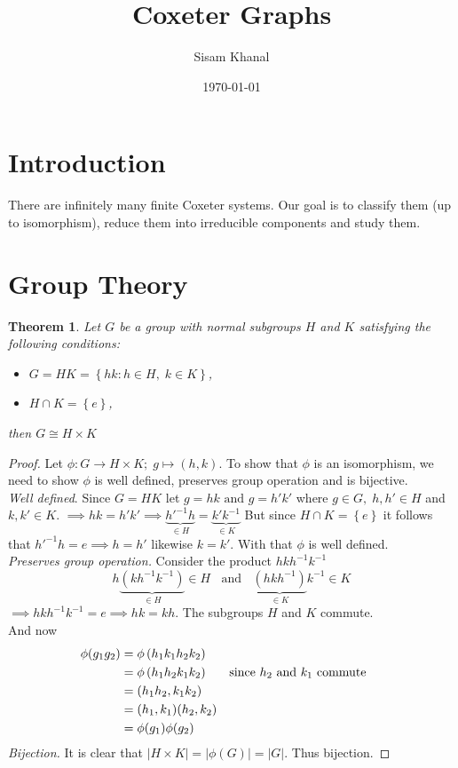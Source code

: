 \documentclass[11pt]{article}
\title{Coxeter Graphs}
\author{Sisam Khanal}
\date{\today}
\theoremstyle{plain}
\newtheorem{theorem}{Theorem}[section]
\begin{document}
\maketitle
\section*{Introduction}
There are infinitely many finite Coxeter systems. Our goal is to classify them (up to isomorphism), reduce them 
into irreducible components and study them.
\section{Group Theory}
\begin{theorem}
	Let $ G $ be a group with normal subgroups $ H  $ and $ K $ satisfying the following conditions:
	\begin{itemize}
		\item $ G = H K = \left\{ h k : h \in H , \; k \in K \right\}  $,
		\item $ H \cap K = \left\{ e \right\}  $,
	\end{itemize}
then $ G \cong H \times K $ 
\end{theorem}
\begin{proof}
Let $ \phi : G \to H \times K; \; g \mapsto (h,k)  $. To show that $ \phi $ is an isomorphism, we need to show $ \phi $ 
is well defined, preserves group operation and is bijective.  \vspace{0.8em} \\
\emph{Well defined}. Since $ G = H K $ let $ g = h k \text{ and } g = h' k' $ where $ g \in G, \; h, h' \in H  $ and
$ k, k' \in K $. $ \implies h k = h' k' \implies \underbrace{ h'^{-1} h}_{ \in H} = \underbrace{ k' k^{-1}}_{ \in K} $
But since $ H \cap K = \left\{ e \right\}  $ it follows that $ h'^{-1} h = e \implies h = h' $ likewise $ k = k' $. 
With that $ \phi $ is well defined.\\
\smallbreak
\noindent \emph{Preserves group operation.} 
Consider the product $ h k h^{-1} k^{-1} $ 
$$ h \underbrace{ \left( k h^{-1} k^{-1} \right) }_{ \in H} \in  H \; \;  \text{ and } \; \; 
\underbrace{ \left( h k h^{-1} \right) }_{ \in  K} k^{-1} \in K$$
$ \implies h k h^{-1} k^{-1} = e \implies  h k = k h  $. The subgroups $ H $ and $ K $ commute.\\
And now
\begin{align*}
	\phi (g_1 g_2) &= \phi \left( h_1 k_1 h_2 k_2 \right) \\
								 &= \phi \left( h_1 h_2 k_1 k_2 \right) && \text{since $ h_2 $ and $ k_1 $ commute }\\ 
								 &= \left( h_1 h_2, k_1 k_2 \right) \\
								 &= (h_1,k_1) (h_2,k_2) \\
								 &=  \phi (g_1) \phi (g_2) 
\end{align*}
\bigbreak
\noindent \emph{Bijection.} 
It is clear that $ \left| H \times K \right| = \left| \phi \left( G \right)  \right| = \left| G \right| $. Thus bijection. 
\end{proof}
\end{document}
